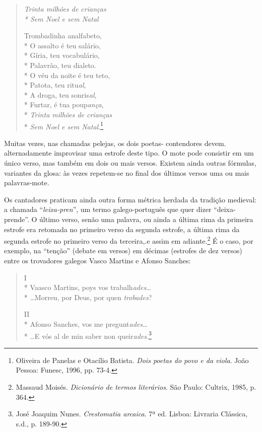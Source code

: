 \begin{verse}

\textit{Trinta milhões de crianças\\*
Sem Noel e sem Natal}

Trombadinha analfabeto,\\*
O assalto é teu salário,\\*
Gíria, teu vocabulário,\\*
Palavrão, teu dialeto.\\*
O véu da noite é teu teto,\\*
Patota, teu ritu\textit{al},\\*
A droga, teu sonris\textit{al},\\*
Furtar, é tua poup\textit{ança},\\*
\textit{Trinta milhões de crianças}\\*
\textit{Sem Noel e sem Natal}.\footnote{ Oliveira de Panelas e Otacílio Batista.
\textit{Dois poetas do povo e da viola}. João Pessoa: Funesc, 1996,
pp. 73-4.}

\end{verse}

Muitas vezes, nas chamadas pelejas, os dois poetas-
contendores devem. alternadamente improvisar uma
estrofe deste tipo. O mote pode consistir em um único verso,
mas também em dois ou mais versos. Existem ainda outras
fórmulas, variantes da glosa: às vezes repetem-se no final
dos últimos versos uma ou mais palavras-mote.

\asterisc

Os cantadores praticam ainda outra forma métrica
herdada da tradição medieval: a chamada
``\textit{leixa-pren}'', um termo galego-português que quer dizer 
``deixa-prende''. O último verso, senão uma palavra, ou ainda a
última rima da primeira estrofe era retomada no primeiro
verso da segunda estrofe, a última rima da segunda estrofe
no primeiro verso da terceira,.e assim em adiante.\footnote{ Massaud
Moisés. \textit{Dicionário de termos literários}. São Paulo: Cultrix, 1985,
p. 364.} É o caso, por exemplo, na ``tenção'' (debate em
versos) em décimas (estrofes de dez versos) entre os trovadores galegos
Vasco Martins e Afonso Sanches:

\begin{verse}

I\\*
Vaasco Martins, poys vos trabalh\textit{ades}\ldots\\*
\ldots Morreu, por Deus, por quen \textit{trobades}?

II\\*
Afonso Sanches, vos me pregunt\textit{ades}\ldots\\*
\ldots E vós al de min saber non queir\textit{ades}.\footnote{ José Joaquim Nunes.
\textit{Crestomatia arcaica}. 7ª ed. Lisboa: Livraria Clássica, s.d.,
p. 189-90.}

\end{verse}

